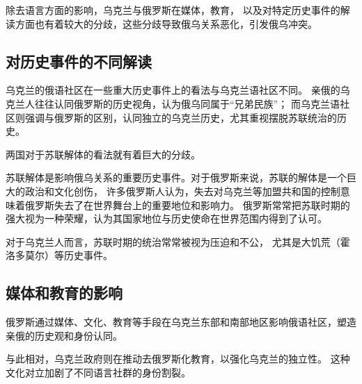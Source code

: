 除去语言方面的影响，乌克兰与俄罗斯在媒体，教育，
以及对特定历史事件的解读方面也有着较大的分歧，这些分歧导致俄乌关系恶化，引发俄乌冲突。

\subsection{对历史事件的不同解读}
乌克兰的俄语社区在一些重大历史事件上的看法与乌克兰语社区不同。
亲俄的乌克兰人往往认同俄罗斯的历史视角，认为俄乌同属于“兄弟民族”；
而乌克兰语社区则强调与俄罗斯的区别，认同独立的乌克兰历史，尤其重视摆脱苏联统治的历史。

两国对于苏联解体的看法就有着巨大的分歧。

苏联解体是影响俄乌关系的重要历史事件。对于俄罗斯来说，苏联的解体是一个巨大的政治和文化创伤，
许多俄罗斯人认为，失去对乌克兰等加盟共和国的控制意味着俄罗斯失去了在世界舞台上的重要地位和影响力。
俄罗斯常常把苏联时期的强大视为一种荣耀，认为其国家地位与历史使命在世界范围内得到了认可。

对于乌克兰人而言，苏联时期的统治常常被视为压迫和不公，
尤其是大饥荒（霍洛多莫尔）等历史事件。

\subsection{媒体和教育的影响}
俄罗斯通过媒体、文化、教育等手段在乌克兰东部和南部地区影响俄语社区，塑造亲俄的历史观和身份认同。

与此相对，乌克兰政府则在推动去俄罗斯化教育，以强化乌克兰的独立性。
这种文化对立加剧了不同语言社群的身份割裂。